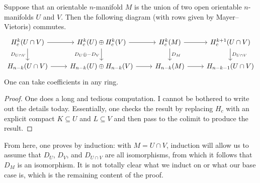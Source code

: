 \documentclass[../notes.tex]{subfiles}
\begin{document}
\begin{lemma}
	Suppose that an orientable $n$-manifold $M$ is the union of two open orientable $n$-manifolds $U$ and $V$. Then the following diagram (with rows given by Mayer--Vietoris) commutes.
	\[\begin{tikzcd}
		{H^k_c(U\cap V)} & {H_c^k(U)\oplus H^k_c(V)} & {H^k_c(M)} & {H^{k+1}_c(U\cap V)} \\
		{H_{n-k}(U\cap V)} & {H_{n-k}(U)\oplus H_{n-k}(V)} & {H_{n-k}(M)} & {H_{n-k-1}(U\cap V)}
		\arrow["{D_{U\cap V}}"', from=1-1, to=2-1]
		\arrow["{D_U\oplus-D_V}"', from=1-2, to=2-2]
		\arrow[from=1-1, to=1-2]
		\arrow[from=2-1, to=2-2]
		\arrow["{D_M}", from=1-3, to=2-3]
		\arrow["{D_{U\cap V}}", from=1-4, to=2-4]
		\arrow[from=1-2, to=1-3]
		\arrow[from=2-2, to=2-3]
		\arrow[from=2-3, to=2-4]
		\arrow[from=1-3, to=1-4]
	\end{tikzcd}\]
	One can take coefficients in any ring.
\end{lemma}
\begin{proof}
	One does a long and tedious computation. I cannot be bothered to write out the details today. Essentially, one checks the result by replacing $H_c$ with an explicit compact $K\subseteq U$ and $L\subseteq V$ and then pass to the colimit to produce the result.
\end{proof}
From here, one proves  by induction: with $M=U\cap V$, induction will allow us to assume that $D_U$, $D_V$, and $D_{U\cap V}$ are all isomorphisms, from which it follows that $D_M$ is an isomorphism. It is not totally clear what we induct on or what our base case is, which is the remaining content of the proof.
\end{document}
